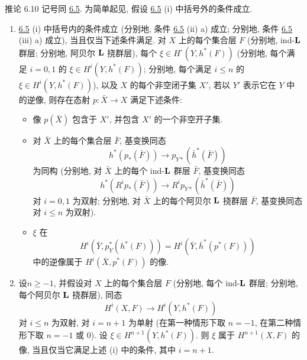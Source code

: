 \begin{enonce*}{推论 6.10}
记号同 \hyperref[XII.prop6.5]{6.5}. 为简单起见, 假设 \hyperref[XII.prop6.5]{6.5} \textup{(i)} 中括号外的条件成立.
\begin{enumerate}
\renewcommand{\theenumi}{\roman{enumi}}
\renewcommand{\labelenumi}{(\theenumi)}
\item \hyperref[XII.prop6.5]{6.5} \textup{(i)} 中括号内的条件成立 (分别地, 条件 \hyperref[XII.prop6.5]{6.5} \textup{(ii) a)} 成立; 分别地, 条件 \hyperref[XII.prop6.5]{6.5} \textup{(iii) a)} 成立), 当且仅当下述条件满足. 对 $X$ 上的每个集合层 $F$ (分别地, ind-$\mathbf{L}$ 群层; 分别地, 阿贝尔 $\mathbf{L}$ 挠群层), 每个 $\xi\in H^{\circ}(Y,h^{\ast}(F))$ (分别地, 每个满足 $i=0,1$ 的 $\xi\in H^{i}(Y,h^{\ast}(F))$; 分别地, 每个满足 $i\leq n$ 的 $\xi\in H^{i}(Y,h^{\ast}(F))$), 以及 $X$ 的每个非空闭子集 $X'$, 若以 $Y'$ 表示它在 $Y$ 中的逆像, 则存在态射 $p:\bar{X}\rightarrow X$ 满足下述条件:
\begin{itemize}
\item[$1^{\circ}$)] 像 $p(\bar{X})$ 包含于 $X'$, 并包含 $X'$ 的一个非空开子集.

\item[$2^{\circ}$)] 对 $\bar{X}$ 上的每个集合层 $\bar{F}$, 基变换同态
$$
h^{\ast}(p_{\ast}(\bar{F}))\longrightarrow
p_{Y\ast}(\bar{h}^{\ast}(\bar{F}))
$$
为同构 (分别地, 对 $\bar{X}$ 上的每个 ind-$\mathbf{L}$ 群层 $\bar{F}$, 基变换同态
$$
h^{\ast}(R^{i}p_{\ast}(\bar{F}))\longrightarrow
R^{i}p_{Y\ast}(\bar{h}^{\ast}(\bar{F}))
$$
对 $i=0,1$ 为双射; 分别地, 对 $\bar{X}$ 上的每个阿贝尔 $\mathbf{L}$ 挠群层 $\bar{F}$, 基变换同态对 $i\leq n$ 为双射).

\item[$3^{\circ}$)] $\xi$ 在
$$
H^{i}(\bar{Y},p_Y^{\ast}(h^{\ast}(F)))
=H^{i}(\bar{Y},\bar{h}^{\ast}(p^{\ast}(F)))
$$
中的逆像属于 $H^{i}(\bar{X},p^{\ast}(F))$ 的像.
\end{itemize}

\item 设\pageoriginale $n\geq -1$, 并假设对 $X$ 上的每个集合层 $F$ (分别地, 每个 ind-$\mathbf{L}$ 群层; 分别地, 每个阿贝尔 $\mathbf{L}$ 挠群层), 同态
$$
H^{i}(X,F)\longrightarrow H^{i}(Y,h^{\ast}(F))
$$
对 $i\leq n$ 为双射, 对 $i=n+1$ 为单射 (在第一种情形下取 $n=-1$, 在第二种情形下取 $n=-1$ 或 $0$). 设 $\xi\in H^{n+1}(Y,h^{\ast}(F))$. 则 $\xi$ 属于 $H^{n+1}(X,F)$ 的像, 当且仅当它满足上述 \textup{(i)} 中的条件, 其中 $i=n+1$.
\end{enumerate}
\end{enonce*}

